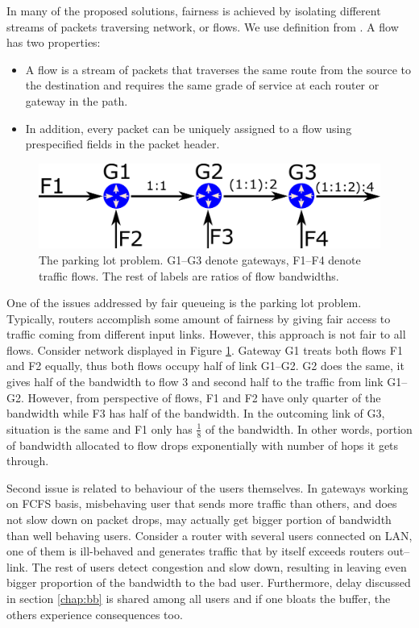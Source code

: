In many of the proposed solutions, fairness is achieved by isolating different streams of packets traversing network, or flows. We use definition from \cite{Zhang:1990:VCN:99517.99525}. A flow has two properties:
\begin{itemize}
	\item A flow is a stream of packets that traverses the same route from the source to the destination and requires the same grade of service at each router or gateway in the path.
	\item In addition, every packet can be uniquely assigned to a flow using prespecified fields in the packet header.
\end{itemize}
 
\begin{figure}
	\centering
	\includegraphics[width=.8\linewidth]{drawings/parking_lot}
	\caption{The parking lot problem. G1--G3 denote gateways, F1--F4 denote traffic flows. The rest of labels are ratios of flow bandwidths.}
	
	\label{fig05:ParkingLot}
\end{figure}

One of the issues addressed by fair queueing is the parking lot problem. Typically, routers accomplish some amount of fairness by giving fair access to traffic coming from different input links. However, this approach is not fair to all flows. Consider network displayed in Figure \ref{fig05:ParkingLot}. Gateway G1 treats both flows F1 and F2 equally, thus both flows occupy half of link G1--G2. G2 does the same, it gives half of the bandwidth to flow 3 and second half to the traffic from link G1--G2. However, from perspective of flows, F1 and F2 have only quarter of the bandwidth while F3 has half of the bandwidth. In the outcoming link of G3, situation is the same and F1 only has $\frac{1}{8}$ of the bandwidth. In other words, portion of bandwidth allocated to flow drops exponentially with number of hops it gets through.

Second issue is related to behaviour of the users themselves. In gateways working on FCFS basis, misbehaving user that sends more traffic than others, and does not slow down on packet drops, may actually get bigger portion of bandwidth than well behaving users. Consider a router with several users connected on LAN, one of them is ill-behaved and generates traffic that by itself exceeds routers out--link. The rest of users detect congestion and slow down, resulting in leaving even bigger proportion of the bandwidth to the bad user. Furthermore, delay discussed in section \ref{chap:bb} is shared among all users and if one bloats the buffer, the others experience consequences too.

